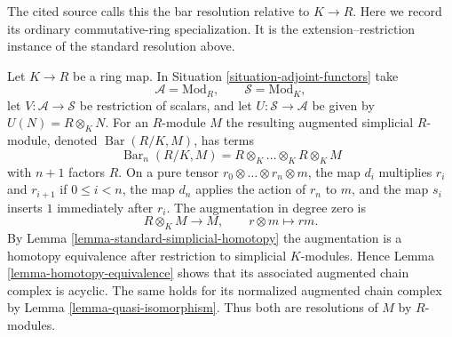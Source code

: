 \begin{example}
\label{example-relative-bar-resolution}
\begin{reference}
\cite[II, Section 11.4.4, pp. 172--173]{cotangent}
\end{reference}
\begin{history}
The cited source calls this the bar resolution relative to $K \to R$.
Here we record its ordinary commutative-ring specialization. It is the
extension--restriction instance of the standard resolution above.
\end{history}
Let $K \to R$ be a ring map. In
Situation \ref{situation-adjoint-functors} take
$$
\mathcal{A} = \text{Mod}_R,\qquad \mathcal{S} = \text{Mod}_K,
$$
let $V : \mathcal{A} \to \mathcal{S}$ be restriction of scalars, and let
$U : \mathcal{S} \to \mathcal{A}$ be given by
$U(N) = R \otimes_K N$. For an $R$-module $M$ the resulting augmented
simplicial $R$-module, denoted $\operatorname{Bar}(R/K, M)$, has terms
$$
\operatorname{Bar}_n(R/K, M) =
R \otimes_K \ldots \otimes_K R \otimes_K M
$$
with $n + 1$ factors $R$. On a pure tensor
$r_0 \otimes \ldots \otimes r_n \otimes m$, the map $d_i$ multiplies
$r_i$ and $r_{i + 1}$ if $0 \leq i < n$, the map $d_n$ applies the action
of $r_n$ to $m$, and the map $s_i$ inserts $1$ immediately after $r_i$.
The augmentation in degree zero is
$$
R \otimes_K M \longrightarrow M,\qquad r \otimes m \longmapsto rm.
$$
By Lemma \ref{lemma-standard-simplicial-homotopy} the augmentation is a
homotopy equivalence after restriction to simplicial $K$-modules. Hence
Lemma \ref{lemma-homotopy-equivalence} shows that its associated augmented
chain complex is acyclic. The same holds for its normalized augmented chain
complex by Lemma \ref{lemma-quasi-isomorphism}. Thus both are resolutions of
$M$ by $R$-modules.
\end{example}
















